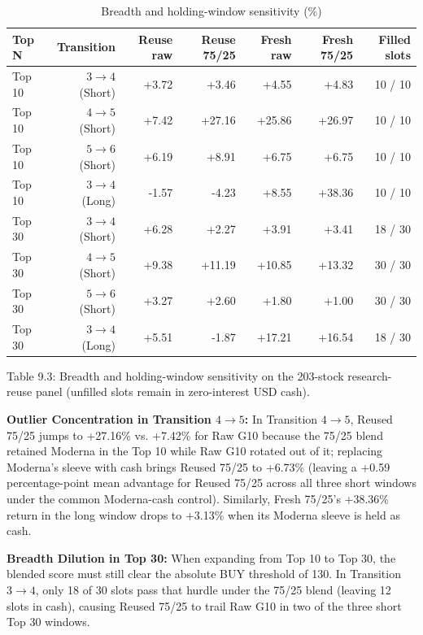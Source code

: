 \documentclass[11pt,a4paper]{article}
\numberwithin{table}{section}
\begin{document}
\begin{minipage}{\linewidth}
\begin{center}\small\setlength{\tabcolsep}{3pt}\renewcommand{\arraystretch}{1.18}
\begin{longtable}{@{}lrrrrrr@{}}
\caption{Breadth and holding-window sensitivity (\%)}\\
\toprule
Top N & Transition & Reuse raw & Reuse 75/25 & Fresh raw & Fresh 75/25 & Filled slots\\\midrule\endhead
Top 10 & $3\to 4$ (Short) & +3.72 & +3.46 & +4.55 & +4.83 & 10 / 10\\
Top 10 & $4\to 5$ (Short) & +7.42 & +27.16 & +25.86 & +26.97 & 10 / 10\\
Top 10 & $5\to 6$ (Short) & +6.19 & +8.91 & +6.75 & +6.75 & 10 / 10\\
Top 10 & $3\to 4$ (Long) & -1.57 & -4.23 & +8.55 & +38.36 & 10 / 10\\
Top 30 & $3\to 4$ (Short) & +6.28 & +2.27 & +3.91 & +3.41 & 18 / 30\\
Top 30 & $4\to 5$ (Short) & +9.38 & +11.19 & +10.85 & +13.32 & 30 / 30\\
Top 30 & $5\to 6$ (Short) & +3.27 & +2.60 & +1.80 & +1.00 & 30 / 30\\
Top 30 & $3\to 4$ (Long) & +5.51 & -1.87 & +17.21 & +16.54 & 18 / 30\\
\bottomrule\end{longtable}\end{center}
\end{minipage}\par
Table 9.3: Breadth and holding-window sensitivity on the 203-stock research-reuse panel (unfilled slots remain in zero-interest USD cash).

\textbf{Outlier Concentration in Transition $4\to 5$:}  In Transition $4\to 5$, Reused 75/25 jumps to +27.16\% vs. +7.42\% for Raw G10 because the 75/25 blend retained Moderna in the Top 10 while Raw G10 rotated out of it; replacing Moderna's sleeve with cash brings Reused 75/25 to +6.73\% (leaving a +0.59 percentage-point mean advantage for Reused 75/25 across all three short windows under the common Moderna-cash control). Similarly, Fresh 75/25's +38.36\% return in the long window drops to +3.13\% when its Moderna sleeve is held as cash.

\textbf{Breadth Dilution in Top 30:}  When expanding from Top 10 to Top 30, the blended score must still clear the absolute BUY threshold of 130. In Transition $3\to 4$, only 18 of 30 slots pass that hurdle under the 75/25 blend (leaving 12 slots in cash), causing Reused 75/25 to trail Raw G10 in two of the three short Top 30 windows.
\end{document}
